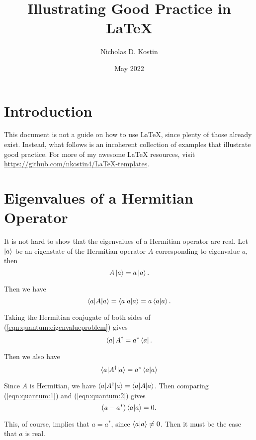 \documentclass{article}
\title{Illustrating Good Practice in {\LaTeX}}
\author{Nicholas D. Kostin}
\date{May 2022}
\numberwithin{equation}{section}
\begin{document}
\maketitle

\section{Introduction}

This document is not a guide on how to use {\LaTeX}, since plenty of those already exist. Instead, what follows is an incoherent collection of examples that illustrate good practice. For more of my awesome {\LaTeX} resources, visit \url{https://github.com/nkostin4/LaTeX-templates}.

\section{Eigenvalues of a Hermitian Operator}

It is not hard to show that the eigenvalues of a Hermitian operator are real. Let $\ket{a}$ be an eigenstate of the Hermitian operator $A$ corresponding to eigenvalue $a$, then
\begin{equation}
    A \ket{a} = a \ket{a}. \label{eqn:quantum:eigenvalueproblem}
\end{equation}

Then we have
\begin{equation}
    \braket{a|A|a} = \braket{a|a|a} = a\braket{a|a}. \label{eqn:quantum:1}
\end{equation}

Taking the Hermitian conjugate of both sides of (\ref{eqn:quantum:eigenvalueproblem}) gives
\begin{equation}
    \bra{a} A^{\dagger} = a^{*} \bra{a}.
\end{equation}

Then we also have
\begin{equation}
    \braket{a|A^{\dagger}|a} = a^{*} \braket{a|a} \label{eqn:quantum:2}
\end{equation}

Since $A$ is Hermitian, we have $\braket{a|A^{\dagger}|a} = \braket{a|A|a}$. Then comparing (\ref{eqn:quantum:1}) and (\ref{eqn:quantum:2}) gives
\begin{equation*}
    \left( a - a^* \right) \braket{a|a} = 0.
\end{equation*}

This, of course, implies that $a = a^*$, since $\braket{a|a} \neq 0$. Then it must be the case that $a$ is real.
\end{document}
